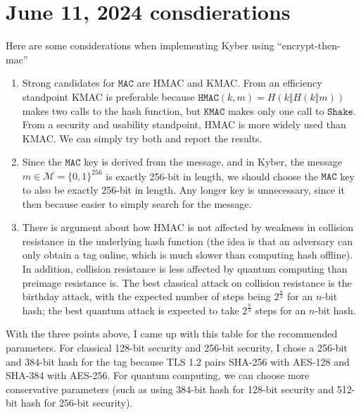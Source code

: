\documentclass{article}
\newcommand{\monospace}{\texttt}
\newcommand{\mac}{\monospace{MAC}}
\begin{document}
\section{June 11, 2024 consdierations}
Here are some considerations when implementing Kyber using ``encrypt-then-mac''

\begin{enumerate}
    \item Strong candidates for $\mac$ are HMAC and KMAC. From an efficiency standpoint KMAC is preferable because $\monospace{HMAC}(k, m) = H(k \Vert H(k \Vert m))$ makes two calls to the hash function, but $\monospace{KMAC}$ makes only one call to $\monospace{Shake}$. From a security and usability standpoint, HMAC is more widely used than KMAC. We can simply try both and report the results.
    
    \item Since the $\mac$ key is derived from the message, and in Kyber, the message $m \in \mathcal{M} = \{0,1\}^{256}$ is exactly 256-bit in length, we should choose the $\mac$ key to also be exactly 256-bit in length. Any longer key is unnecessary, since it then because easier to simply search for the message.
    
    \item There is argument about how HMAC is not affected by weakness in collision resistance in the underlying hash function\cite{krawczyk1997hmac} (the idea is that an adversary can only obtain a tag online, which is much slower than computing hash offline). In addition, collision resistance is less affected by quantum computing than preimage resistance is. The best classical attack on collision resistance is the birthday attack, with the expected number of steps being $2^{\frac{n}{2}}$ for an $n$-bit hash; the best quantum attack\cite{brassard1997quantum} is expected to take $2^{\frac{n}{3}}$ steps for an $n$-bit hash.
\end{enumerate}

With the three points above, I came up with this table for the recommended parameters. For classical 128-bit security and 256-bit security, I chose a 256-bit and 384-bit hash for the tag because TLS 1.2 pairs SHA-256 with AES-128 and SHA-384 with AES-256. For quantum computing, we can choose more conservative parameters (such as using 384-bit hash for 128-bit security and 512-bit hash for 256-bit security).
\end{document}
